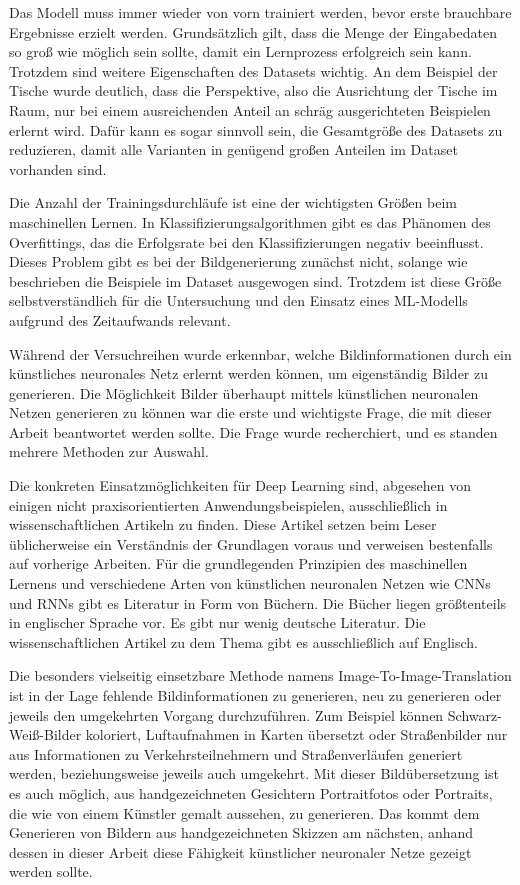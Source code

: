 Das Modell muss immer wieder von vorn trainiert werden, bevor erste brauchbare Ergebnisse erzielt werden. Grundsätzlich gilt, dass die Menge der Eingabedaten so groß wie möglich sein sollte, damit ein Lernprozess erfolgreich sein kann. Trotzdem sind weitere Eigenschaften des Datasets wichtig. An dem Beispiel der Tische wurde deutlich, dass die Perspektive, also die Ausrichtung der Tische im Raum, nur bei einem ausreichenden Anteil an schräg ausgerichteten Beispielen erlernt wird. Dafür kann es sogar sinnvoll sein, die Gesamtgröße des Datasets zu reduzieren, damit alle Varianten in genügend großen Anteilen im Dataset vorhanden sind.

Die Anzahl der Trainingsdurchläufe ist eine der wichtigsten Größen beim maschinellen Lernen. In Klassifizierungsalgorithmen gibt es das Phänomen des Overfittings, das die Erfolgsrate bei den Klassifizierungen negativ beeinflusst. Dieses Problem gibt es bei der Bildgenerierung zunächst nicht, solange wie beschrieben die Beispiele im Dataset ausgewogen sind. Trotzdem ist diese Größe selbstverständlich für die Untersuchung und den Einsatz eines ML-Modells aufgrund des Zeitaufwands relevant.

Während der Versuchreihen wurde erkennbar, welche Bildinformationen durch ein künstliches neuronales Netz erlernt werden können, um eigenständig Bilder zu generieren. Die Möglichkeit Bilder überhaupt mittels künstlichen neuronalen Netzen generieren zu können war die erste und wichtigste Frage, die mit dieser Arbeit beantwortet werden sollte. Die Frage wurde recherchiert, und es standen mehrere Methoden zur Auswahl.

Die konkreten Einsatzmöglichkeiten für Deep Learning sind, abgesehen von einigen nicht praxisorientierten Anwendungsbeispielen, ausschließlich in wissenschaftlichen Artikeln zu finden. Diese Artikel setzen beim Leser üblicherweise ein Verständnis der Grundlagen voraus und verweisen bestenfalls auf vorherige Arbeiten. Für die grundlegenden Prinzipien des maschinellen Lernens und verschiedene Arten von künstlichen neuronalen Netzen wie CNNs und RNNs gibt es Literatur in Form von Büchern. Die Bücher liegen größtenteils in englischer Sprache vor. Es gibt nur wenig deutsche Literatur. Die wissenschaftlichen Artikel zu dem Thema gibt es ausschließlich auf Englisch.

Die besonders vielseitig einsetzbare Methode namens Image-To-Image-Translation ist in der Lage fehlende Bildinformationen zu generieren, neu zu generieren oder jeweils den umgekehrten Vorgang durchzuführen. Zum Beispiel können Schwarz-Weiß-Bilder koloriert, Luftaufnahmen in Karten übersetzt oder Straßenbilder nur aus Informationen zu Verkehrsteilnehmern und Straßenverläufen generiert werden, beziehungsweise jeweils auch umgekehrt. Mit dieser Bildübersetzung ist es auch möglich, aus handgezeichneten Gesichtern Portraitfotos oder Portraits, die wie von einem Künstler gemalt aussehen, zu generieren. Das kommt dem Generieren von Bildern aus handgezeichneten Skizzen am nächsten, anhand dessen in dieser Arbeit diese Fähigkeit künstlicher neuronaler Netze gezeigt werden sollte.

